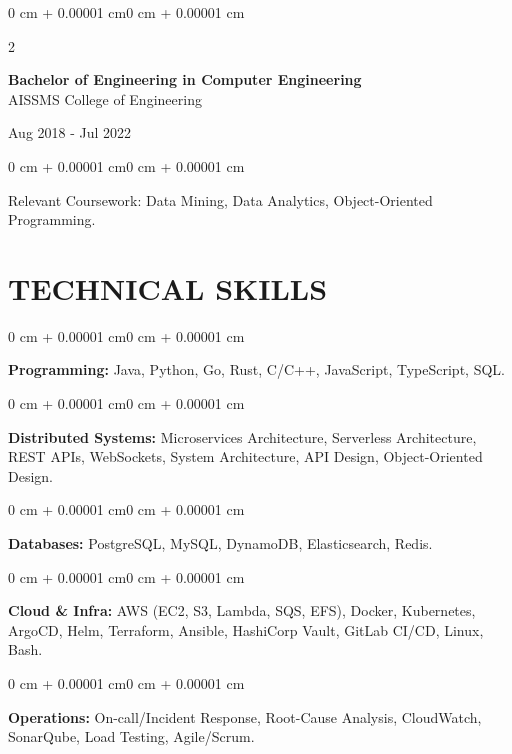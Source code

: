 \documentclass[10pt, letterpaper]{article}
\newenvironment{onecolentry}{
    \begin{adjustwidth}{0 cm + 0.00001 cm}{0 cm + 0.00001 cm}
}{
    \end{adjustwidth}
}
\newenvironment{twocolentry}[2][]{
    \onecolentry
    \def\secondColumn{#2}
    \setcolumnwidth{\fill, 4.5 cm}
    \begin{paracol}{2}
}{
    \switchcolumn \raggedleft \secondColumn
    \end{paracol}
    \endonecolentry
}
\begin{document}
\begin{twocolentry}{
    Aug 2018 - Jul 2022
}
    \textbf{Bachelor of Engineering in Computer Engineering} \\
    AISSMS College of Engineering
\end{twocolentry}
\begin{onecolentry}
Relevant Coursework: Data Mining, Data Analytics, Object-Oriented Programming.
\end{onecolentry}
\section{TECHNICAL SKILLS}
\begin{onecolentry}
\textbf{Programming:} Java, Python, Go, Rust, C/C++, JavaScript, TypeScript, SQL.
\end{onecolentry}
\vspace{0.06 cm}
\begin{onecolentry}
\textbf{Distributed Systems:} Microservices Architecture, Serverless Architecture, REST APIs, WebSockets, System Architecture, API Design, Object-Oriented Design.
\end{onecolentry}
\vspace{0.06 cm}
\begin{onecolentry}
\textbf{Databases:} PostgreSQL, MySQL, DynamoDB, Elasticsearch, Redis.
\end{onecolentry}
\vspace{0.06 cm}
\begin{onecolentry}
\textbf{Cloud \& Infra:} AWS (EC2, S3, Lambda, SQS, EFS), Docker, Kubernetes, ArgoCD, Helm, Terraform, Ansible, HashiCorp Vault, GitLab CI/CD, Linux, Bash.
\end{onecolentry}
\vspace{0.06 cm}
\begin{onecolentry}
\textbf{Operations:} On-call/Incident Response, Root-Cause Analysis, CloudWatch, SonarQube, Load Testing, Agile/Scrum.
\end{onecolentry}

\end{document}
